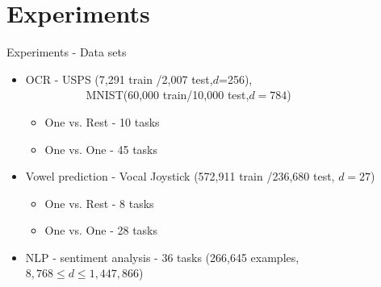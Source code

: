 \documentclass{beamer}
\begin{document}


\section{Experiments}

\begin{frame}{Experiments - Data sets}

\begin{itemize}
\item OCR - USPS \!(7,291 train /2,007 test,$d$=256),\\~~~~~~~~~~
 MNIST\!(60,000 train/10,000 test,$d=784$)  \newline
\begin{itemize}
\item One vs. Rest - 10 tasks\newline
\item One vs. One - 45 tasks \newline
\end{itemize}
\item Vowel prediction - Vocal Joystick (572,911 train /236,680 test, $d=27$)\newline
\begin{itemize}
\item One vs. Rest - 8 tasks\newline
\item One vs. One - 28 tasks \newline
\end{itemize}
\item NLP - sentiment analysis - 36 tasks (266,645 examples,\newline
~~ $8,768\le d\le 1,447,866$)\newline
\end{itemize}
\end{frame}
\end{document}
